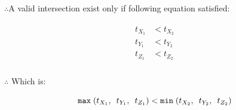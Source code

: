 $\therefore$\;\;\;\;A valid intersection exist only if following equation satisfied:

\[
\begin{array}{lr}
\begin{aligned}
t_{X_1} &< t_{X_2}\\
t_{Y_1} &< t_{Y_2}\\
t_{Z_1} &< t_{Z_2}\\
\end{aligned}
\end{array}
\]

$\therefore$ Which is:

\begin{equation}
\label{equ:ray-box-3d-intersection}
\texttt{max}\;(t_{X_1},\enspace t_{Y_1},\enspace t_{Z_1}) < \texttt{min}\;(t_{X_2},\enspace t_{Y_2},\enspace t_{Z_2})
\end{equation}


